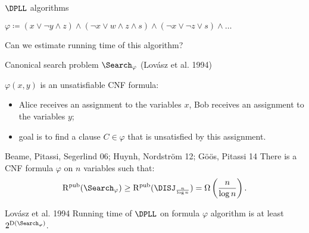 \begin{frame}{$\DPLL$ algorithms}

    $\varphi \coloneqq (x \lor \neg{y} \land z) \land (\neg{x} \lor w \land z \land s) \land
    (\neg{x} \lor \neg{z} \lor s) \land \dots$

    \pause
    \begin{center}
    	    
    \end{center}

    \vspace{0.1cm}
        
	\pause
    \pause
    \pause
    \pause

    Can we estimate running time of this algorithm?

\end{frame}

\begin{frame}{Canonical search problem $\Search_{\varphi}$ (Lov{\'{a}}sz et al. 1994)}
    
    $\varphi(x, y)$ is an unsatisfiable CNF formula:
    \begin{itemize}
        \item Alice receives an assignment to the variables $x$, Bob receives an assignment to the
            variables $y$;
        \item goal is to find a clause $C \in \varphi$ that is unsatisfied by this assignment.
    \end{itemize}

    \pause

    \begin{block}{Beame, Pitassi, Segerlind 06; Huynh, Nordstr{\"{o}}m 12; G{\"{o}}{\"{o}}s, Pitassi 14}
        There is a CNF formula $\varphi$ on $n$ variables such that:
        $$\RCC(\Search_{\varphi}) \ge \RCC(\DISJ_{\frac{n}{\log n}}) = \Omega\left( \frac{n}{\log n} \right).$$
    \end{block}

    \begin{block}{Lov{\'{a}}sz et al. 1994}
        Running time of $\DPLL$ on formula $\varphi$ algorithm is at least $2^{\DCC(\Search_{\varphi})}$.
    \end{block}
\end{frame}

